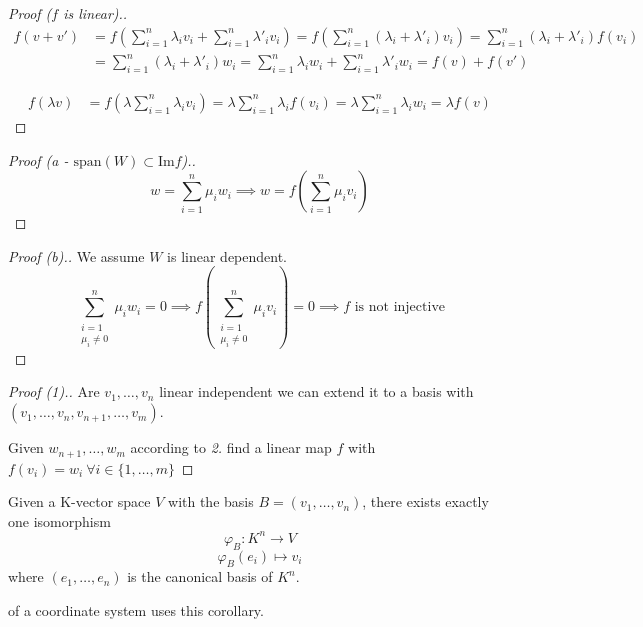 \begin{proof}[Proof (\(f\) is linear).]
   \begin{equation}
      \begin{split}
         f(v + v') & = f\left(\sum_{i=1}^n \lambda_i v_i + \sum_{i=1}^n \lambda'_i v_i\right)
         = f\left(\sum_{i=1}^n (\lambda_i + \lambda'_i) v_i\right) = \sum_{i=1}^n (\lambda_i + \lambda'_i) f(v_i) \\
         & = \sum_{i=1}^n (\lambda_i + \lambda'_i) w_i
         = \sum_{i=1}^n \lambda_i w_i + \sum_{i=1}^n \lambda'_i w_i
         = f(v) + f(v')
      \end{split}
   \end{equation}

   \begin{equation}
      \begin{split}
         f(\lambda v) & = f\left(\lambda \sum_{i=1}^n \lambda_i v_i\right)
         = \lambda \sum_{i=1}^n \lambda_i f(v_i)
         = \lambda \sum_{i=1}^n \lambda_i w_i
         = \lambda f(v)
      \end{split}
   \end{equation}
\end{proof}

\begin{proof}[Proof (a - \(\text{span}(W) \subset \text{Im}f\)).]
   \[w = \sum_{i=1}^n \mu_i w_i \implies w = f\left(\sum_{i=1}^n \mu_i v_i\right)\]
\end{proof}

\begin{proof}[Proof (b).]
   We assume \(W\) is linear dependent.
   \[\sum_{\substack{i=1 \\ \mu_i \neq 0}}^n \mu_i w_i = 0 \implies f\left(\sum_{\substack{i=1 \\ \mu_i \neq 0}}^n \mu_i v_i\right) = 0 \implies f \text{ is not injective}\]
\end{proof}

\begin{proof}[Proof (1).]
   Are \(v_1, \ldots, v_n\) linear independent we can extend it to a basis with \((v_1, \ldots, v_n, v_{n+1}, \ldots, v_m)\).

   Given \(w_{n+1}, \ldots, w_m\) according to \textit{2.} find a linear map \(f\) with \(f(v_i) = w_i~\forall i \in \{1, \ldots, m\}\)
\end{proof}

\begin{corollary}\label{cor:basis_isomorphism}
   Given a K-vector space \(V\) with the basis \(B = (v_1, \ldots, v_n)\), there exists exactly one isomorphism
   \[\varphi_{B}: K^n \to V\]
   \[\varphi_{B}(e_i) \mapsto v_i\]
   where \((e_1, \ldots, e_n)\) is the canonical basis of \(K^n\). %
\end{corollary}
\begin{remark}
    of a coordinate system uses this corollary.
\end{remark}

